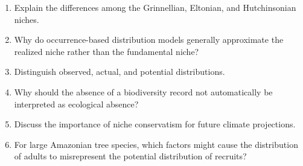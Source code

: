 \begin{exercicios}
\begin{enumerate}
  \item Explain the differences among the Grinnellian, Eltonian, and Hutchinsonian niches.
  \item Why do occurrence-based distribution models generally approximate the realized niche rather than the fundamental niche?
  \item Distinguish observed, actual, and potential distributions.
  \item Why should the absence of a biodiversity record not automatically be interpreted as ecological absence?
  \item Discuss the importance of niche conservatism for future climate projections.
  \item For large Amazonian tree species, which factors might cause the distribution of adults to misrepresent the potential distribution of recruits?
\end{enumerate}
\end{exercicios}
